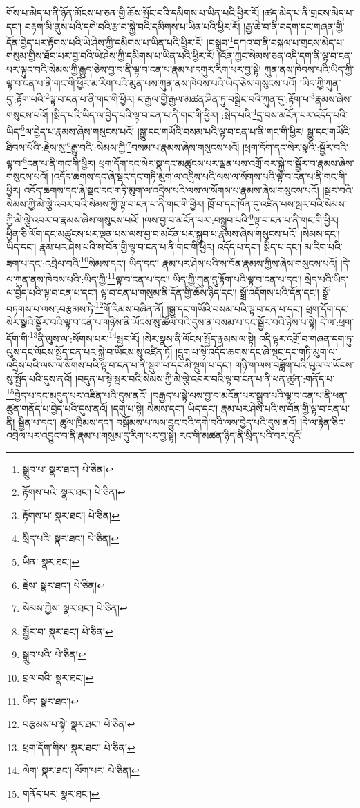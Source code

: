 གོས་པ་མེད་པ་ནི་ཉོན་མོངས་པ་ཅན་གྱི་ཆོས་སྤོང་བའི་དམིགས་པ་ཡིན་པའི་ཕྱིར་རོ། །ཚད་མེད་པ་ནི་གྲངས་མེད་པ་དང་། བརྟག་མི་ནུས་པའི་དགེ་བའི་རྩ་བ་སྐྱེ་བའི་དམིགས་པ་ཡིན་པའི་ཕྱིར་རོ། །རྒྱ་ཆེ་བ་ནི་བདག་དང་གཞན་གྱི་དོན་བྱེད་པར་རྟོགས་པའི་ཡེ་ཤེས་ཀྱི་དམིགས་པ་ཡིན་པའི་ཕྱིར་རོ། །བསྒྲུབ་\footnote{སྒྲུབ་པ་  སྣར་ཐང་།  པེ་ཅིན། }དཀའ་བ་ནི་བསྐལ་པ་གྲངས་མེད་པ་གསུམ་གྱིས་ཐོབ་པར་བྱ་བའི་ཡེ་ཤེས་ཀྱི་དམིགས་པ་ཡིན་པའི་ཕྱིར་རོ། །འོན་ཀྱང་སེམས་ཅན་འདི་དག་ནི་ལྟ་བ་ངན་པར་ལྟུང་བའི་སེམས་ཀྱི་རྒྱུད་ཅེས་བྱ་བ་ནི་ལྟ་བ་ངན་པ་རྣམ་པ་དགུར་རིག་པར་བྱ་སྟེ། ཀུན་ནས་ཁེབས་པའི་ཡིད་ཀྱི་ལྟ་བ་ངན་པ་ནི་གང་གི་ཕྱིར་མ་རིག་པའི་མུན་པས་ཀུན་ནས་ཁེབས་པའི་ཡིད་ཅེས་གསུངས་པའོ། །ཡིད་ཀྱི་ཀུན་དུ་:རྟོག་པའི་\footnote{རྟོགས་པའི་  སྣར་ཐང་།  པེ་ཅིན། }ལྟ་བ་ངན་པ་ནི་གང་གི་ཕྱིར། ང་རྒྱལ་གྱི་རྒྱལ་མཚན་ཤིན་ཏུ་བསྒྲེང་བའི་ཀུན་དུ་:རྟོག་པ་\footnote{རྟོགས་པ་  སྣར་ཐང་།  པེ་ཅིན། }རྣམས་ཞེས་གསུངས་པའོ། །སྲིད་པའི་ཡིད་ལ་བྱེད་པའི་ལྟ་བ་ངན་པ་ནི་གང་གི་ཕྱིར། :སྲེད་པའི་\footnote{སྲིད་པའི་  སྣར་ཐང་།  པེ་ཅིན། }དྲ་བས་མངོན་པར་འདོད་པའི་ཡིད་\footnote{ཡིན་  སྣར་ཐང་། }ལ་བྱེད་པ་རྣམས་ཞེས་གསུངས་པའོ། །སྒྱུ་དང་གཡོའི་བསམ་པའི་ལྟ་བ་ངན་པ་ནི་གང་གི་ཕྱིར། སྒྱུ་དང་གཡོའི་ཐིབས་པོའི་:རྗེས་སུ་\footnote{རྗེས་  སྣར་ཐང་།  པེ་ཅིན། }རྒྱུ་བའི་:སེམས་ཀྱི་\footnote{སེམས་ཀྱིས་  སྣར་ཐང་།  པེ་ཅིན། }བསམ་པ་རྣམས་ཞེས་གསུངས་པའོ། །ཕྲག་དོག་དང་སེར་སྣའི་:སྦྱོར་བའི་ལྟ་བ་\footnote{སྦྱོར་བ་  སྣར་ཐང་།  པེ་ཅིན། }ངན་པ་ནི་གང་གི་ཕྱིར། ཕྲག་དོག་དང་སེར་སྣ་དང་མཚུངས་པར་ལྡན་པས་འགྲོ་བར་སྐྱེ་བ་སྦྱོར་བ་རྣམས་ཞེས་གསུངས་པའོ། །འདོད་ཆགས་དང་ཞེ་སྡང་དང་གཏི་མུག་ལ་འདྲིས་པའི་ལས་ལ་སོགས་པའི་ལྟ་བ་ངན་པ་ནི་གང་གི་ཕྱིར། འདོད་ཆགས་དང་ཞེ་སྡང་དང་གཏི་མུག་ལ་འདྲིས་པའི་ལས་ལ་སོགས་པ་རྣམས་ཞེས་གསུངས་པའོ། །སྦར་བའི་སེམས་ཀྱི་མེ་ལྕེ་འབར་བའི་སེམས་ཀྱི་ལྟ་བ་ངན་པ་ནི་གང་གི་ཕྱིར། ཁྲོ་བ་དང་ཁོན་དུ་འཛིན་པས་སྦར་བའི་སེམས་ཀྱི་མེ་ལྕེ་འབར་བ་རྣམས་ཞེས་གསུངས་པའོ། །ལས་བྱ་བ་མངོན་པར་:བསྒྲུབ་པའི་\footnote{སྒྲུབ་པའི་  པེ་ཅིན། }ལྟ་བ་ངན་པ་ནི་གང་གི་ཕྱིར། ཕྱིན་ཅི་ལོག་དང་མཚུངས་པར་ལྡན་པས་ལས་བྱ་བ་མངོན་པར་སྒྲུབ་པ་རྣམས་ཞེས་གསུངས་པའོ། །སེམས་དང་། ཡིད་དང་། རྣམ་པར་ཤེས་པའི་ས་བོན་གྱི་ལྟ་བ་ངན་པ་ནི་གང་གི་ཕྱིར། འདོད་པ་དང་། སྲིད་པ་དང་། མ་རིག་པའི་ཟག་པ་དང་:འབྲེལ་བའི་\footnote{བྲལ་བའི་  སྣར་ཐང་། }སེམས་དང་། ཡིད་དང་། རྣམ་པར་ཤེས་པའི་ས་བོན་རྣམས་ཀྱིས་ཞེས་གསུངས་པའོ། །དེ་ལ་ཀུན་ནས་ཁེབས་པའི་:ཡིད་ཀྱི་\footnote{ཡིད་  སྣར་ཐང་། }ལྟ་བ་ངན་པ་དང་། ཡིད་ཀྱི་ཀུན་དུ་རྟོག་པའི་ལྟ་བ་ངན་པ་དང་། སྲེད་པའི་ཡིད་ལ་བྱེད་པའི་ལྟ་བ་ངན་པ་དང་། ལྟ་བ་ངན་པ་གསུམ་ནི་དོན་གྱི་ཆོས་ཉིད་དང་། སྒྲོ་འདོགས་པའི་དོན་དང་། སྒྲོ་བཏགས་པ་ལས་:བརྩམས་ཏེ་\footnote{བརྩམས་པ་སྟེ་  སྣར་ཐང་།  པེ་ཅིན། }གོ་རིམས་བཞིན་ནོ། །སྒྱུ་དང་གཡོའི་བསམ་པའི་ལྟ་བ་ངན་པ་དང་། ཕྲག་དོག་དང་སེར་སྣའི་སྦྱོར་བའི་ལྟ་བ་ངན་པ་གཉིས་ནི་ཡོངས་སུ་ཚོལ་བའི་དུས་ན་བསམ་པ་དང་སྦྱོར་བའི་ཉེས་པ་སྟེ། དེ་ལ་:ཕྲག་དོག་གི་\footnote{ཕྲག་དོག་གིས་  སྣར་ཐང་།  པེ་ཅིན། }ནི་ལུས་ལ་:སོགས་པར་\footnote{ལེག་  སྣར་ཐང་། ལོག་པར་  པེ་ཅིན། }སྦྱར་རོ། །སེར་སྣས་ནི་ལོངས་སྤྱོད་རྣམས་ལ་སྟེ། འདི་ལྟར་འགྲོ་བ་གཞན་དག་ཏུ་ལུས་དང་ལོངས་སྤྱོད་ངན་པར་སྐྱེ་བ་ཡོངས་སུ་འཛིན་ཏོ། །དྲུག་པ་སྟེ་འདོད་ཆགས་དང་ཞེ་སྡང་དང་གཏི་མུག་ལ་འདྲིས་པའི་ལས་ལ་སོགས་པའི་ལྟ་བ་ངན་པ་ནི་སྡུག་པ་དང་མི་སྡུག་པ་དང་། གཉི་ག་ལས་བཟློག་པའི་ཡུལ་ལ་ཡོངས་སུ་སྤྱོད་པའི་དུས་ནའོ། །བདུན་པ་སྟེ་སྦར་བའི་སེམས་ཀྱི་མེ་ལྕེ་འབར་བའི་ལྟ་བ་ངན་པ་ནི་ཕན་ཚུན་:གནོད་པ་\footnote{གནོད་པར་  སྣར་ཐང་། }བྱེད་པ་དང་མདུད་པར་འཛིན་པའི་དུས་ནའོ། །བརྒྱད་པ་སྟེ་ལས་བྱ་བ་མངོན་པར་སྒྲུབ་པའི་ལྟ་བ་ངན་པ་ནི་ཕན་ཚུན་གནོད་པ་བྱེད་པའི་དུས་ནའོ། །དགུ་པ་སྟེ། སེམས་དང་། ཡིད་དང་། རྣམ་པར་ཤེས་པའི་ས་བོན་གྱི་ལྟ་བ་ངན་པ་ནི། སྦྱིན་པ་དང་། ཚུལ་ཁྲིམས་དང་། བསྒོམས་པ་ལས་བྱུང་བའི་དགེ་བའི་ལས་བྱེད་པའི་དུས་ནའོ། །དེ་ལ་རྟེན་ཅིང་འབྲེལ་པར་འབྱུང་བ་ནི་རྣམ་པ་གསུམ་དུ་རིག་པར་བྱ་སྟེ། རང་གི་མཚན་ཉིད་ནི་སྲིད་པའི་བར་དུའོ། 